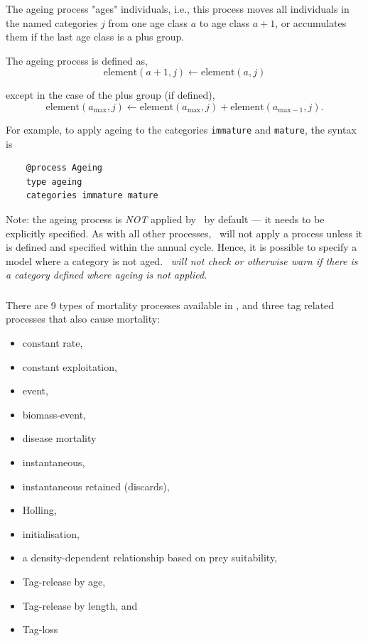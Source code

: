 The ageing process "ages" individuals, i.e., this process moves all individuals in the named categories $j$ from one age class $a$ to age class $a + 1$, or accumulates them if the last age class is a plus group.

The ageing process is defined as,
\begin{equation}
  \text{element}(a + 1,j) \leftarrow \text{element}(a,j)
\end{equation}

except in the case of the plus group (if defined),
\begin{equation}
  \text{element}(a_{\text{max}}, j) \leftarrow \text{element}(a_{\text{max}}, j) + \text{element}(a_{\text{max}-1}, j).
\end{equation}

For example, to apply ageing to the categories \texttt{immature} and \texttt{mature}, the syntax is

{\small{\begin{verbatim}
	@process Ageing
	type ageing
	categories immature mature
	\end{verbatim}}}

Note: the ageing process is \emph{NOT} applied by \CNAME\ by default --- it needs to be explicitly specified. As with all other processes, \CNAME\ will not apply a process unless it is defined and specified within the annual cycle. Hence, it is possible to specify a model where a category is not aged. \emph{\CNAME\ will not check or otherwise warn if there is a category defined where ageing is not applied.}

\subsubsection{\label{sec:Process-Mortality}}

There are 9 types of mortality processes available in \CNAME, and three tag related processes that also cause mortality:

\begin{itemize}
	\item constant rate,
	\item constant exploitation,
	\item event,
	\item biomass-event,
	\item disease mortality
	\item instantaneous,
	\item instantaneous retained (discards),
	\item Holling,
	\item initialisation,
	\item a density-dependent relationship based on prey suitability,
	\item Tag-release by age,
	\item Tag-release by length, and	
	\item Tag-loss
\end{itemize}

